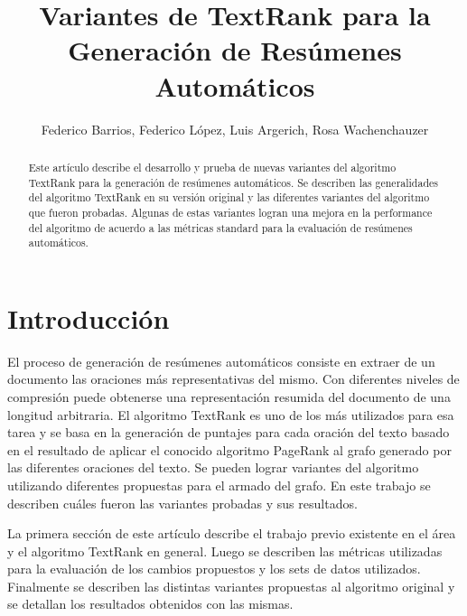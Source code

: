 \documentclass{llncs}
\begin{document}
\frontmatter

\title{Variantes de TextRank para la Generación de Resúmenes Automáticos}

\author{Federico Barrios, Federico López, Luis Argerich, Rosa Wachenchauzer}

\maketitle

\begin{abstract}
Este artículo describe el desarrollo y prueba de nuevas variantes del algoritmo
TextRank para la generación de resúmenes automáticos. Se describen las generalidades
del algoritmo TextRank en su versión original y las diferentes variantes del 
algoritmo que fueron probadas. Algunas de estas variantes logran una mejora en
la performance del algoritmo de acuerdo a las métricas standard para la evaluación de
resúmenes automáticos. 

\end{abstract}

\section{Introducción}
El proceso de generación de resúmenes automáticos consiste en extraer de un documento las oraciones más representativas del mismo. Con diferentes niveles de compresión puede obtenerse una representación resumida del documento de una longitud arbitraria. El algoritmo TextRank es uno de los más utilizados para esa tarea y se basa en la generación de puntajes para cada oración del texto basado en el resultado de aplicar el conocido algoritmo PageRank al grafo generado por las diferentes oraciones del texto. Se pueden lograr variantes del algoritmo utilizando diferentes propuestas para el armado del grafo. En este trabajo se describen cuáles fueron las variantes probadas y sus resultados.

La primera sección de este artículo describe el trabajo previo existente en el área y el algoritmo TextRank en general. Luego se describen las métricas utilizadas para la evaluación de los cambios propuestos y los sets de datos utilizados. Finalmente se describen las distintas variantes propuestas al algoritmo original y se detallan los resultados obtenidos con las mismas.
\end{document}
